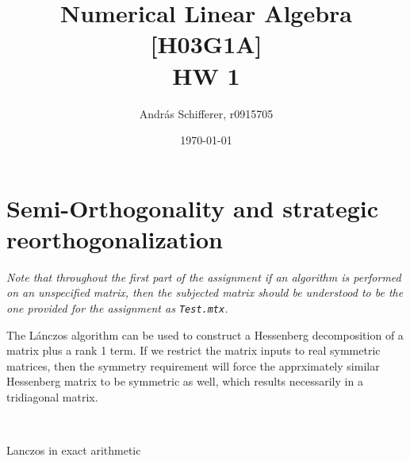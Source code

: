 \documentclass{article}
\author{Andr\'as Schifferer, r0915705}
\title{Numerical Linear Algebra [H03G1A]\\{\LARGE HW 1}}
\date{\today}
\begin{document}
	\maketitle
	\tableofcontents
	
	
	
	\newpage
	\section{Semi-Orthogonality and strategic reorthogonalization}
	\textit{Note that throughout the first part of the assignment if an algorithm is performed on an unspecified matrix, then the subjected matrix should be understood to be the one provided for the assignment as \texttt{Test.mtx}.
	}
	
	The Lánczos algorithm can be used to construct a Hessenberg decomposition of a matrix plus a rank 1 term. If we restrict the matrix inputs to real symmetric matrices, then the symmetry requirement will force the apprximately similar Hessenberg matrix to be symmetric as well, which results necessarily in a tridiagonal matrix.
	\begin{algorithm2e}[ht]
		
		\SetAlgoLined
		\\
		\caption{Lanczos in exact arithmetic}\label{alg:Lanczos}
	\end{algorithm2e}\\
	
\end{document}
